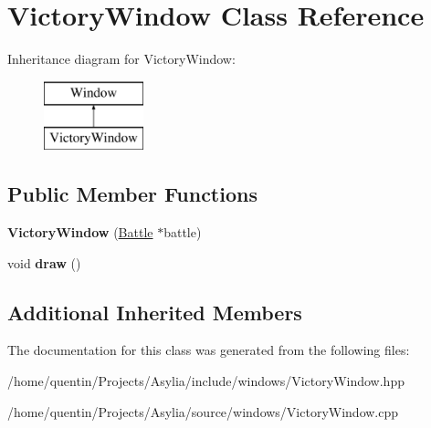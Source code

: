 \hypertarget{classVictoryWindow}{\section{Victory\-Window Class Reference}
\label{classVictoryWindow}
}
Inheritance diagram for Victory\-Window\-:\begin{figure}[H]
\begin{center}
\leavevmode
\includegraphics[height=2.000000cm]{classVictoryWindow}
\end{center}
\end{figure}
\subsection*{Public Member Functions}
\begin{DoxyCompactItemize}
\item 
\hypertarget{classVictoryWindow_a5f3da410bd0dbb63afba25aadea6222d}{{\bfseries Victory\-Window} (\hyperlink{classBattle}{Battle} $\ast$battle)}\label{classVictoryWindow_a5f3da410bd0dbb63afba25aadea6222d}

\item 
\hypertarget{classVictoryWindow_a6eef42e3d15f12aa872fa77b145150ac}{void {\bfseries draw} ()}\label{classVictoryWindow_a6eef42e3d15f12aa872fa77b145150ac}

\end{DoxyCompactItemize}
\subsection*{Additional Inherited Members}


The documentation for this class was generated from the following files\-:\begin{DoxyCompactItemize}
\item 
/home/quentin/\-Projects/\-Asylia/include/windows/Victory\-Window.\-hpp\item 
/home/quentin/\-Projects/\-Asylia/source/windows/Victory\-Window.\-cpp\end{DoxyCompactItemize}
